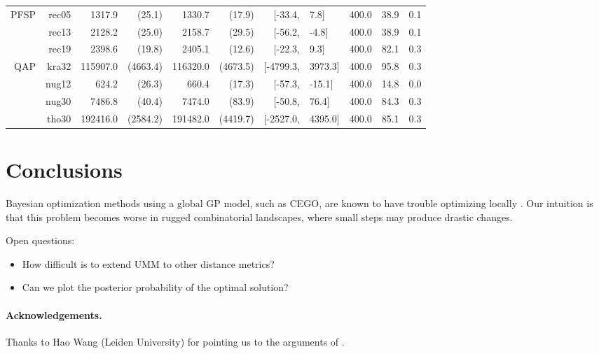 \documentclass[runningheads]{llncs}
\begin{document}
\begin{table}[tb]
{\begin{tabular}{r@{\hskip -2ex}*{5}{r}rl*{3}{r}}
   PFSP     & rec05        & 1317.9                  & (25.1)     & 1330.7    & (17.9)                 & $[$-33.4,     & 7.8$]$        & 400.0& 38.9 & 0.1  \\
       & rec13        & 2128.2                  & (25.0)     & 2158.7    & (29.5)                 & $[$-56.2,     & -4.8$]$       & 400.0& 38.9 & 0.1  \\
       & rec19        & 2398.6                  & (19.8)     & 2405.1    & (12.6)                 & $[$-22.3,     & 9.3$]$        & 400.0& 82.1 & 0.3  \\\midrule
    QAP     & kra32        & 115907.0                & (4663.4)   & 116320.0  & (4673.5)               & $[$-4799.3,   & 3973.3$]$     & 400.0& 95.8 & 0.3  \\
        & nug12        & 624.2                   & (26.3)     & 660.4     & (17.3)                 & $[$-57.3,     & -15.1$]$      & 400.0& 14.8 & 0.0  \\
        & nug30        & 7486.8                  & (40.4)     & 7474.0    & (83.9)                 & $[$-50.8,     & 76.4$]$       & 400.0& 84.3 & 0.3  \\
        & tho30        & 192416.0                & (2584.2)   & 191482.0  & (4419.7)               & $[$-2527.0,   & 4395.0$]$     & 400.0& 85.1 & 0.3  \\
\bottomrule
\end{tabular}}
\end{table}




\section{Conclusions}

Bayesian optimization methods using a global GP model, such as CEGO, are known
to have trouble optimizing locally \citep{EriPeaGar2019scalable}. Our
intuition is that this problem becomes worse in rugged combinatorial
landscapes, where small steps may produce drastic changes.

Open questions:
\begin{itemize}
\item How difficult is to extend UMM to other distance metrics?
\item Can we plot the posterior probability of the optimal solution?
\end{itemize}

\paragraph*{Acknowledgements.}

Thanks to Hao Wang (Leiden University) for pointing us to the arguments of
\citet{EriPeaGar2019scalable}.




\renewcommand{\doi}[1]{doi:\hspace{.16667em plus .08333em}\discretionary{}{}{}\href{https://doi.org/#1}{\urlstyle{rm}\nolinkurl{#1}}}


\end{document}
